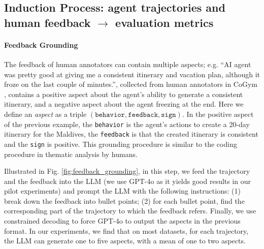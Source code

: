 
\subsection{Induction Process: agent trajectories and human feedback $\rightarrow$
	evaluation metrics}
\label{sec:induction_process}

\paragraph{Feedback Grounding}
The feedback of human annotators can contain multiple aspects; e.g. \textsf{``AI
	agent was pretty good at giving me a consistent itinerary and vacation plan, although
	it froze on the last couple of minutes.''},
collected from human annotators in CoGym \citep{shao2024collaborative}, contains
a positive aspect about the agent's ability to generate a consistent itinerary, and
a negative aspect about the agent freezing at the end. Here we define an \emph{aspect}
as a triple $(\texttt{behavior}, \texttt{feedback}, \texttt{sign})$. In the
positive aspect of the previous example, the \texttt{behavior} is the agent's
actions to create a 20-day itinerary for the Maldives, the \texttt{feedback} is
that the created itinerary is consistent and the \texttt{sign} is positive. This
grounding procedure is similar to the coding procedure in thematic analysis by
humans.

Illustrated in Fig. \ref{fig:feedback_grounding}, in this step, we feed the trajectory
and the feedback into the LLM (we use GPT-4o \citep{openai2024gpt4ocard} as it yields
good results in our pilot experiments) and prompt the LLM with the following
instructions: (1) break down the feedback into bullet points; (2) for each
bullet point, find the corresponding part of the trajectory to which the feedback
refers. Finally, we use constrained decoding to force GPT-4o to output the aspects
in the previous format. In our experiments, we find that on most datasets, for
each trajectory, the LLM can generate one to five aspects, with a mean of one to
two aspects.

